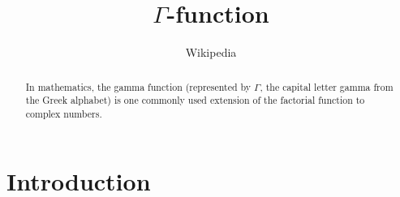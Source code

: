 \documentclass[12pt,twocolumn,a4paper]{article}
\begin{document}
\title{$\Gamma$-function}
\author{Wikipedia}
\maketitle
\begin{abstract}
In mathematics, the gamma function (represented by $\Gamma$, the capital letter 
gamma from the Greek alphabet) is one commonly used extension of the 
factorial function to complex numbers.
\end{abstract}
\section{Introduction}
\end{document}
